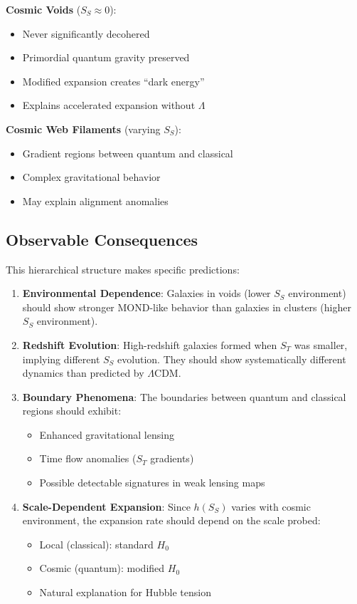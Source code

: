 \documentclass[12pt]{article}
\begin{document}
\textbf{Cosmic Voids} ($S_S \approx 0$):
\begin{itemize}
    \item Never significantly decohered
    \item Primordial quantum gravity preserved
    \item Modified expansion creates ``dark energy''
    \item Explains accelerated expansion without $\Lambda$
\end{itemize}

\textbf{Cosmic Web Filaments} (varying $S_S$):
\begin{itemize}
    \item Gradient regions between quantum and classical
    \item Complex gravitational behavior
    \item May explain alignment anomalies
\end{itemize}

\subsection{Observable Consequences}

This hierarchical structure makes specific predictions:
\begin{enumerate}
    \item \textbf{Environmental Dependence}: Galaxies in voids (lower $S_S$ environment) should show stronger MOND-like behavior than galaxies in clusters (higher $S_S$ environment).
    \item \textbf{Redshift Evolution}: High-redshift galaxies formed when $S_T$ was smaller, implying different $S_S$ evolution. They should show systematically different dynamics than predicted by $\Lambda$CDM.
    \item \textbf{Boundary Phenomena}: The boundaries between quantum and classical regions should exhibit:
    \begin{itemize}
        \item Enhanced gravitational lensing
        \item Time flow anomalies ($S_T$ gradients)
        \item Possible detectable signatures in weak lensing maps
    \end{itemize}
    \item \textbf{Scale-Dependent Expansion}: Since $h(S_S)$ varies with cosmic environment, the expansion rate should depend on the scale probed:
    \begin{itemize}
        \item Local (classical): standard $H_0$
        \item Cosmic (quantum): modified $H_0$
        \item Natural explanation for Hubble tension
    \end{itemize}
\end{enumerate}
\end{document}
